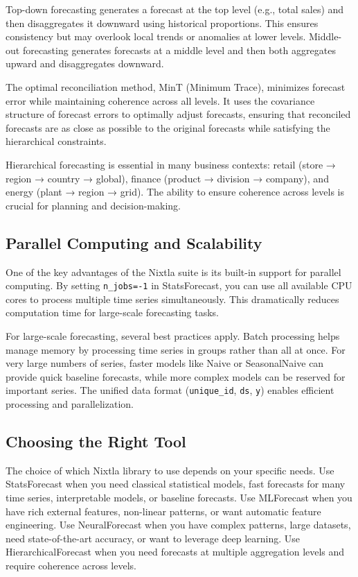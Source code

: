 Top-down forecasting generates a forecast at the top level (e.g., total sales) and then disaggregates it downward using historical proportions. This ensures consistency but may overlook local trends or anomalies at lower levels. Middle-out forecasting generates forecasts at a middle level and then both aggregates upward and disaggregates downward.

The optimal reconciliation method, MinT (Minimum Trace), minimizes forecast error while maintaining coherence across all levels. It uses the covariance structure of forecast errors to optimally adjust forecasts, ensuring that reconciled forecasts are as close as possible to the original forecasts while satisfying the hierarchical constraints.

Hierarchical forecasting is essential in many business contexts: retail (store → region → country → global), finance (product → division → company), and energy (plant → region → grid). The ability to ensure coherence across levels is crucial for planning and decision-making.

\subsection{Parallel Computing and Scalability}

One of the key advantages of the Nixtla suite is its built-in support for parallel computing. By setting \texttt{n\_jobs=-1} in StatsForecast, you can use all available CPU cores to process multiple time series simultaneously. This dramatically reduces computation time for large-scale forecasting tasks.

For large-scale forecasting, several best practices apply. Batch processing helps manage memory by processing time series in groups rather than all at once. For very large numbers of series, faster models like Naive or SeasonalNaive can provide quick baseline forecasts, while more complex models can be reserved for important series. The unified data format (\texttt{unique\_id}, \texttt{ds}, \texttt{y}) enables efficient processing and parallelization.

\subsection{Choosing the Right Tool}

The choice of which Nixtla library to use depends on your specific needs. Use StatsForecast when you need classical statistical models, fast forecasts for many time series, interpretable models, or baseline forecasts. Use MLForecast when you have rich external features, non-linear patterns, or want automatic feature engineering. Use NeuralForecast when you have complex patterns, large datasets, need state-of-the-art accuracy, or want to leverage deep learning. Use HierarchicalForecast when you need forecasts at multiple aggregation levels and require coherence across levels.

